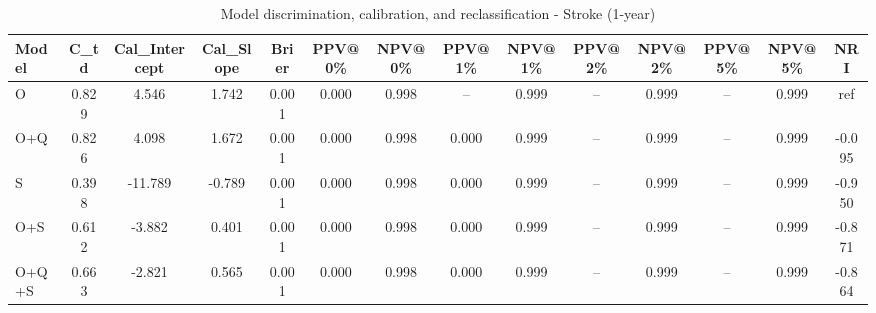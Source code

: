 \begin{table}[htbp]
\centering
\small
\caption{Model discrimination, calibration, and reclassification - Stroke (1-year)}
\label{tab:perf_stroke_1y}
\begin{tabular}{lccccccccccccc}
\toprule
Model & C\_td & Cal\_Intercept & Cal\_Slope & Brier & PPV@0\% & NPV@0\% & PPV@1\% & NPV@1\% & PPV@2\% & NPV@2\% & PPV@5\% & NPV@5\% & NRI \\
\midrule
O & 0.829 & 4.546 & 1.742 & 0.001 & 0.000 & 0.998 & -- & 0.999 & -- & 0.999 & -- & 0.999 & ref \\
O+Q & 0.826 & 4.098 & 1.672 & 0.001 & 0.000 & 0.998 & 0.000 & 0.999 & -- & 0.999 & -- & 0.999 & -0.095 \\
S & 0.398 & -11.789 & -0.789 & 0.001 & 0.000 & 0.998 & 0.000 & 0.999 & -- & 0.999 & -- & 0.999 & -0.950 \\
O+S & 0.612 & -3.882 & 0.401 & 0.001 & 0.000 & 0.998 & 0.000 & 0.999 & -- & 0.999 & -- & 0.999 & -0.871 \\
O+Q+S & 0.663 & -2.821 & 0.565 & 0.001 & 0.000 & 0.998 & 0.000 & 0.999 & -- & 0.999 & -- & 0.999 & -0.864 \\
\bottomrule
\end{tabular}
\end{table}
